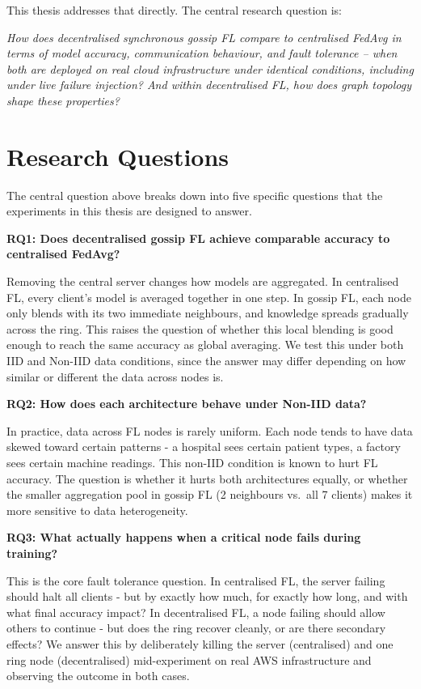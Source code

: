\documentclass[12pt]{report}
\begin{document}
This thesis addresses that directly. The central research question is:

\vspace{0.3cm}
\textit{How does decentralised synchronous gossip FL compare to centralised
FedAvg in terms of model accuracy, communication behaviour, and fault tolerance
-- when both are deployed on real cloud infrastructure under identical
conditions, including under live failure injection? And within decentralised
FL, how does graph topology shape these properties?}
\vspace{0.3cm}

\section{Research Questions}

The central question above breaks down into five specific questions that the
experiments in this thesis are designed to answer.

\textbf{RQ1: Does decentralised gossip FL achieve comparable accuracy to
centralised FedAvg?}

Removing the central server changes how models are aggregated. In centralised
FL, every client's model is averaged together in one step. In gossip FL, each
node only blends with its two immediate neighbours, and knowledge spreads
gradually across the ring. This raises the question of whether this local
blending is good enough to reach the same accuracy as global averaging. We test
this under both IID and Non-IID data conditions, since the answer may differ
depending on how similar or different the data across nodes is.

\textbf{RQ2: How does each architecture behave under Non-IID data?}

In practice, data across FL nodes is rarely uniform. Each node tends to have
data skewed toward certain patterns - a hospital sees certain patient types,
a factory sees certain machine readings. This non-IID condition is known to hurt
FL accuracy. The question is whether it hurts both architectures equally, or
whether the smaller aggregation pool in gossip FL (2 neighbours vs.\ all 7
clients) makes it more sensitive to data heterogeneity.

\textbf{RQ3: What actually happens when a critical node fails during training?}

This is the core fault tolerance question. In centralised FL, the server failing
should halt all clients - but by exactly how much, for exactly how long, and
with what final accuracy impact? In decentralised FL, a node failing should allow
others to continue - but does the ring recover cleanly, or are there secondary
effects? We answer this by deliberately killing the server (centralised) and one
ring node (decentralised) mid-experiment on real AWS infrastructure and observing
the outcome in both cases.
\end{document}
